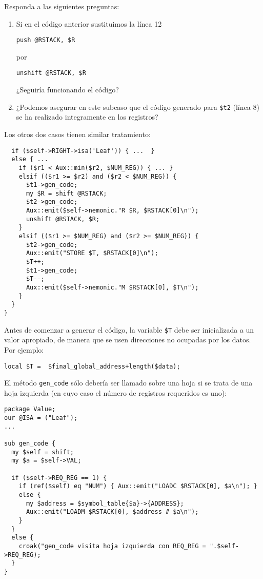 \begin{exercise}
Responda a las siguientes preguntas:

\begin{enumerate}
\item
Si en el código anterior sustituimos la línea 12

\begin{center}
\verb|push @RSTACK, $R|
\end{center}

por 

\begin{center}
\verb|unshift @RSTACK, $R| 
\end{center}

¿Seguiría funcionando el código?

\item
¿Podemos asegurar en este subcaso que el código generado para \verb|$t2|
(línea 8) se ha realizado integramente en los registros?
\end{enumerate}
\end{exercise}

Los otros dos casos tienen similar tratamiento:

\begin{verbatim}
  if ($self->RIGHT->isa('Leaf')) { ...  }
  else { ...
    if ($r1 < Aux::min($r2, $NUM_REG)) { ... }
    elsif (($r1 >= $r2) and ($r2 < $NUM_REG)) {
      $t1->gen_code;
      my $R = shift @RSTACK;
      $t2->gen_code;
      Aux::emit($self->nemonic."R $R, $RSTACK[0]\n");
      unshift @RSTACK, $R;
    }
    elsif (($r1 >= $NUM_REG) and ($r2 >= $NUM_REG)) {
      $t2->gen_code;
      Aux::emit("STORE $T, $RSTACK[0]\n");
      $T++;
      $t1->gen_code;
      $T--;
      Aux::emit($self->nemonic."M $RSTACK[0], $T\n");
    }
  }
}
\end{verbatim}

Antes de comenzar a generar el código,
la variable \verb|$T| debe ser inicializada a un valor apropiado, 
de manera que se usen direcciones no ocupadas por los datos.
Por ejemplo:

\begin{verbatim}
local $T =  $final_global_address+length($data);
\end{verbatim}

El método \verb|gen_code| sólo debería ser llamado sobre una hoja
si se trata de una hoja izquierda (en cuyo caso el número de
registros requeridos es uno):
\begin{verbatim}
package Value;
our @ISA = ("Leaf");
...

sub gen_code {
  my $self = shift;
  my $a = $self->VAL;

  if ($self->REQ_REG == 1) {
    if (ref($self) eq "NUM") { Aux::emit("LOADC $RSTACK[0], $a\n"); }
    else { 
      my $address = $symbol_table{$a}->{ADDRESS};
      Aux::emit("LOADM $RSTACK[0], $address # $a\n");
    }
  }
  else {
    croak("gen_code visita hoja izquierda con REQ_REG = ".$self->REQ_REG);
  }
}
\end{verbatim}


